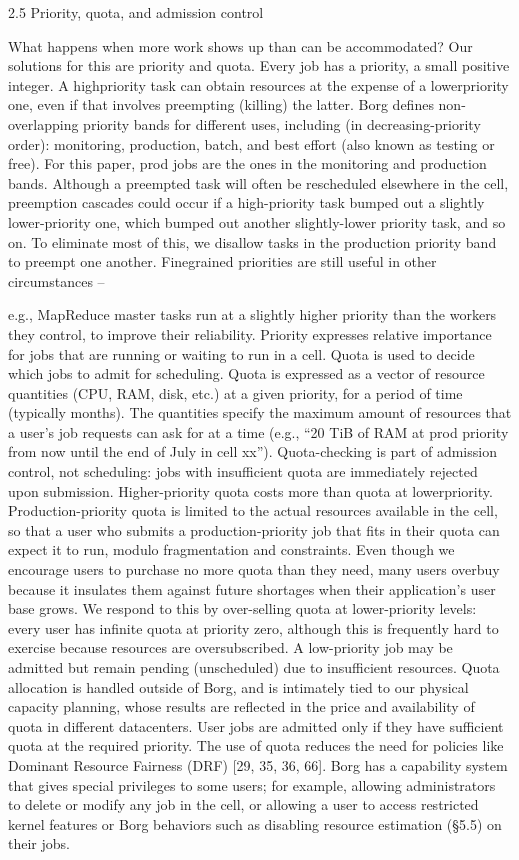 2.5 Priority, quota, and admission control

What happens when more work shows up than can be accommodated? Our solutions for this are priority and quota.
Every job has a priority, a small positive integer. A highpriority task can obtain resources at the expense of a lowerpriority one, even if that involves preempting (killing) the
latter. Borg defines non-overlapping priority bands for different uses, including (in decreasing-priority order): monitoring, production, batch, and best effort (also known as
testing or free). For this paper, prod jobs are the ones in the
monitoring and production bands.
Although a preempted task will often be rescheduled
elsewhere in the cell, preemption cascades could occur if
a high-priority task bumped out a slightly lower-priority
one, which bumped out another slightly-lower priority task,
and so on. To eliminate most of this, we disallow tasks in
the production priority band to preempt one another. Finegrained priorities are still useful in other circumstances –

e.g., MapReduce master tasks run at a slightly higher priority
than the workers they control, to improve their reliability.
Priority expresses relative importance for jobs that are
running or waiting to run in a cell. Quota is used to decide
which jobs to admit for scheduling. Quota is expressed as
a vector of resource quantities (CPU, RAM, disk, etc.) at a
given priority, for a period of time (typically months). The
quantities specify the maximum amount of resources that
a user’s job requests can ask for at a time (e.g., “20 TiB
of RAM at prod priority from now until the end of July
in cell xx”). Quota-checking is part of admission control,
not scheduling: jobs with insufficient quota are immediately
rejected upon submission.
Higher-priority quota costs more than quota at lowerpriority. Production-priority quota is limited to the actual
resources available in the cell, so that a user who submits
a production-priority job that fits in their quota can expect it
to run, modulo fragmentation and constraints. Even though
we encourage users to purchase no more quota than they
need, many users overbuy because it insulates them against
future shortages when their application’s user base grows.
We respond to this by over-selling quota at lower-priority
levels: every user has infinite quota at priority zero, although
this is frequently hard to exercise because resources are oversubscribed. A low-priority job may be admitted but remain
pending (unscheduled) due to insufficient resources.
Quota allocation is handled outside of Borg, and is intimately tied to our physical capacity planning, whose results
are reflected in the price and availability of quota in different datacenters. User jobs are admitted only if they have sufficient quota at the required priority. The use of quota reduces the need for policies like Dominant Resource Fairness
(DRF) [29, 35, 36, 66].
Borg has a capability system that gives special privileges
to some users; for example, allowing administrators to delete
or modify any job in the cell, or allowing a user to access
restricted kernel features or Borg behaviors such as disabling
resource estimation (§5.5) on their jobs.

